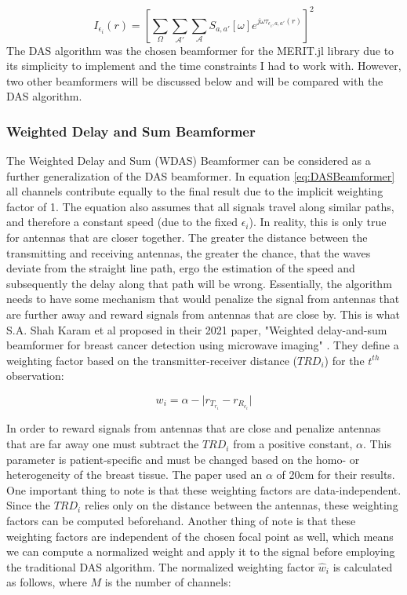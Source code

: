 \begingroup
\large
\begin{equation}
    I_{\epsilon_i}(r) = \left [\sum_{\Omega}\sum_{\mathcal{A}'}\sum_{\mathcal{A}} S_{a, a'}[\omega]e^{j\omega \tau_{\epsilon_i, a, a'}(r)}\right ]^2
    \label{eq:DASBeamformer}
\end{equation}
\endgroup
The DAS algorithm was the chosen beamformer for the MERIT.jl library due to its simplicity to implement and the time
constraints I had to work with. However, two other beamformers will be discussed below and will be compared with the DAS
algorithm.

\subsubsection{Weighted Delay and Sum Beamformer}
The Weighted Delay and Sum (WDAS) Beamformer can be considered as a further generalization of the DAS beamformer.
In equation \ref{eq:DASBeamformer} all channels contribute equally to the final result due to the implicit weighting
factor of 1. The equation also assumes that all signals travel along similar paths, and therefore a constant speed (due
to the fixed $\epsilon_i$). In reality, this is only true for antennas that are closer together. The greater the
distance between the transmitting and receiving antennas, the greater the chance, that the waves deviate from the straight line
path, ergo the estimation of the speed and subsequently the delay along that path will be wrong. Essentially, the
algorithm needs to have some mechanism that would penalize the signal from antennas that are further away and reward
signals from antennas that are close by. This is what S.A. Shah Karam et al proposed in their 2021 paper, "Weighted delay-and-sum beamformer for breast cancer detection using
microwave imaging" \cite{shahkaramWeightedDelayandsumBeamformer2021}. They define a weighting factor based on the
transmitter-receiver distance ($TRD_i$) for
the $t^{th}$ observation:

\begingroup
\large
\begin{equation}
    w_i = \alpha -  \lvert r_{T_{r_i}} - r_{R_{c_i}} \rvert
\end{equation}
\endgroup

In order to reward signals from antennas that are close and penalize antennas that are far away one must subtract the
$TRD_i$ from a positive constant, $\alpha$. This parameter is patient-specific and must be changed based on the homo- or
heterogeneity of the breast tissue. The paper used an $\alpha$ of 20cm for their results. One important thing to note is
that these weighting factors are data-independent. Since the $TRD_i$ relies only on the distance between the antennas,
these weighting factors can be computed beforehand. Another thing of note is that these weighting factors are
independent of the chosen focal point as well, which means we can compute a normalized weight and apply it to the signal
before employing the traditional DAS algorithm. The normalized weighting factor $\hat{w}_i$ is calculated as follows,
where $M$ is the number of channels:

